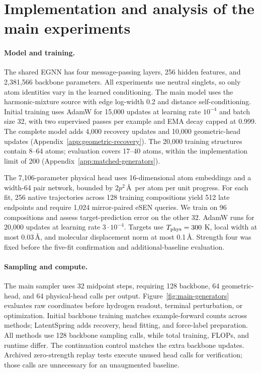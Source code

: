 \section{Implementation and analysis of the main experiments}\label{app:main-implementation}
\paragraph{Model and training.}
The shared EGNN has four message-passing layers, 256 hidden features, and 2,381,566 backbone parameters. All experiments use neutral singlets, so only atom identities vary in the learned conditioning. The main model uses the harmonic-mixture source with edge log-width 0.2 and distance self-conditioning. Initial training uses AdamW for 15,000 updates at learning rate $10^{-4}$ and batch size 32, with two supervised passes per example and EMA decay capped at 0.999. The complete model adds 4,000 recovery updates and 10,000 geometric-head updates (Appendix~\ref{app:geometric-recovery}). The 20,000 training structures contain 8--64 atoms; evaluation covers 17--40 atoms, within the implementation limit of 200 (Appendix~\ref{app:matched-generators}).

The 7,106-parameter physical head uses 16-dimensional atom embeddings and a width-64 pair network, bounded by $2p^2$\,\AA\ per atom per unit progress. For each fit, 256 native trajectories across 128 training compositions yield 512 late endpoints and require 1,024 mirror-paired eSEN queries. We train on 96 compositions and assess target-prediction error on the other 32. AdamW runs for 20,000 updates at learning rate $3\cdot10^{-4}$. Targets use $T_{\rm phys}=300$ K, local width at most 0.03\,\AA, and molecular displacement norm at most 0.1\,\AA. Strength four was fixed before the five-fit confirmation and additional-baseline evaluation.

\paragraph{Sampling and compute.}
The main sampler uses 32 midpoint steps, requiring 128 backbone, 64 geometric-head, and 64 physical-head calls per output. Figure~\ref{fig:main-generators} evaluates raw coordinates before hydrogen readout, terminal perturbation, or optimization. Initial backbone training matches example-forward counts across methods; LatentSpring adds recovery, head fitting, and force-label preparation. All methods use 128 backbone sampling calls, while total training, FLOPs, and runtime differ. The continuation control matches the extra backbone updates. Archived zero-strength replay tests execute unused head calls for verification; those calls are unnecessary for an unaugmented baseline.

